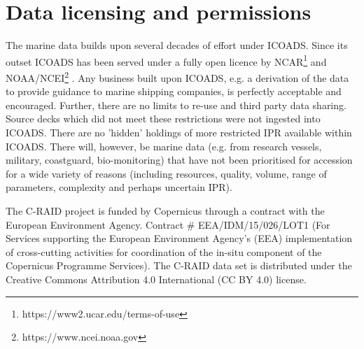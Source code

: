 \section{Data licensing and permissions}
The marine data builds upon several decades of effort under ICOADS. Since its outset ICOADS has been served under a fully open licence by NCAR\footnote{https://www2.ucar.edu/terms-of-use} and NOAA/NCEI\footnote{https://www.ncei.noaa.gov} . Any business built upon ICOADS, e.g. a derivation of the data to provide guidance to marine shipping companies, is perfectly acceptable and encouraged. Further, there are no limits to re-use and third party data sharing. Source decks which did not meet these restrictions were not ingested into ICOADS. There are no 'hidden' holdings of more restricted IPR available within ICOADS. There will, however, be marine data (e.g. from research vessels, military, coastguard, bio-monitoring) that have not been prioritised for accession for a wide variety of reasons (including resources, quality, volume, range of parameters, complexity and perhaps uncertain IPR).

The C-RAID project is funded by Copernicus through a contract with the European Environment Agency. Contract \# EEA/IDM/15/026/LOT1 (For Services supporting the European Environment Agency’s (EEA) implementation of cross-cutting activities for coordination of the in-situ component of the Copernicus Programme Services).  The C-RAID data set \cite{craid202404} is distributed under the Creative Commons Attribution 4.0 International (CC BY 4.0) license.
